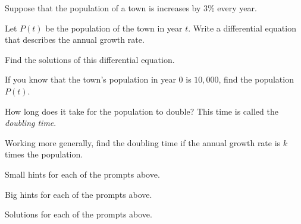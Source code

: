 \begin{activity} \label{A:7.4.1}  
Suppose that the population of a town is increases by $3$\% every year.

\ba
\item Let $P(t)$ be the population of the town in year $t$.  Write a
  differential equation that describes the annual growth rate.

\item Find the solutions of this differential equation.

\item If you know that the town's population in year $0$ is $10,000$, find
  the population $P(t)$.

\item How long does it take for the population to double?  This time
  is called the {\em doubling time}.

\item Working more generally, find the doubling time if the annual
  growth rate is $k$ times the population.

\ea
\end{activity}
\begin{smallhint}
\ba
	\item Small hints for each of the prompts above.
\ea
\end{smallhint}
\begin{bighint}
\ba
	\item Big hints for each of the prompts above.
\ea
\end{bighint}
\begin{activitySolution}
\ba
	\item Solutions for each of the prompts above.
\ea
\end{activitySolution}
\aftera